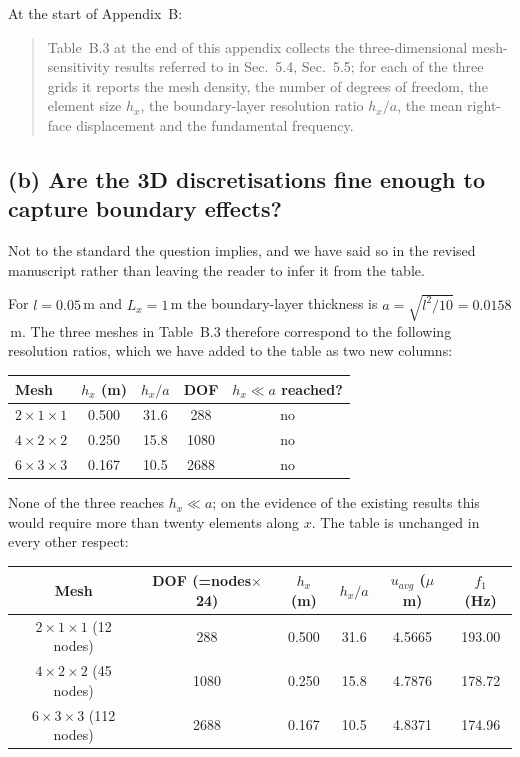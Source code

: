 \documentclass[12pt,a4paper]{article}
\begin{document}
\noindent At the start of Appendix~B:

\begin{quote}\small
Table~B.3 at the end of this appendix collects the
three-dimensional mesh-sensitivity results referred to in
Sec.~5.4,
Sec.~5.5; for each of the three grids it
reports the mesh density, the number of degrees of freedom, the element
size $h_{x}$, the boundary-layer resolution ratio $h_{x}/a$, the mean
right-face displacement and the fundamental frequency. 
\end{quote}

\subsection*{(b) Are the 3D discretisations fine enough to capture boundary effects?}

Not to the standard the question implies, and we have said so in the revised manuscript rather than leaving the reader to infer it from the table.

For $l=0.05$\,m and $L_x=1$\,m the boundary-layer thickness is $a=\sqrt{l^2/10}=0.0158$\,m. The three meshes in Table~B.3 therefore correspond to the following resolution ratios, which we have added to the table as two new columns:

\begin{center}\small
\begin{tabular}{lcccc}
\hline
Mesh & $h_x$ (m) & $h_x/a$ & DOF & $h_x\ll a$ reached? \\
\hline
$2\times1\times1$ & 0.500 & 31.6 & 288  & no \\
$4\times2\times2$ & 0.250 & 15.8 & 1080 & no \\
$6\times3\times3$ & 0.167 & 10.5 & 2688 & no \\
\hline
\end{tabular}
\end{center}

None of the three reaches $h_x\ll a$; on the evidence of the existing results this would require more than twenty elements along $x$. The table is unchanged in every other respect:

\begin{center}\small
\begin{tabular}{cccccc}
\hline
Mesh & DOF (=nodes$\times$24) & $h_x$ (m) & $h_x/a$ & $u_{avg}$ ($\mu$m) & $f_1$ (Hz) \\
\hline
$2\times1\times1$ (12 nodes) & 288 & 0.500 & 31.6 & 4.5665 & 193.00 \\
$4\times2\times2$ (45 nodes) & 1080 & 0.250 & 15.8 & 4.7876 & 178.72 \\
$6\times3\times3$ (112 nodes) & 2688 & 0.167 & 10.5 & 4.8371 & 174.96 \\
\hline
\end{tabular}
\end{center}
\end{document}
